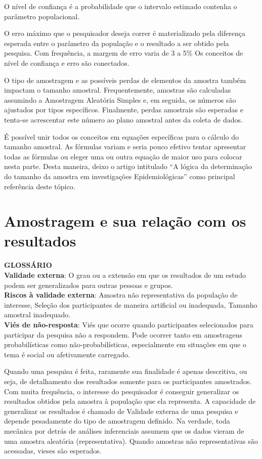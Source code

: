 \documentclass[
]{book}
\begin{document}
O nível de confiança é a probabilidade que o intervalo estimado contenha
o parâmetro populacional.

O erro máximo que o pesquisador deseja correr é materializado pela
diferença esperada entre o parâmetro da população e o resultado a ser
obtido pela pesquisa. Com frequência, a margem de erro varia de 3 a 5\%
Os conceitos de nível de confiança e erro são conectados.

O tipo de amostragem e as possíveis perdas de elementos da amostra
também impactam o tamanho amostral. Frequentemente, amostras são
calculadas assumindo a Amostragem Aleatória Simples e, em seguida, os
números são ajustados por tipos específicos. Finalmente, perdas
amostrais são esperadas e tenta-se acrescentar este número ao plano
amostral antes da coleta de dados.

É possível unir todos os conceitos em equações específicas para o
cálculo do tamanho amostral. As fórmulas variam e seria pouco efetivo
tentar apresentar todas as fórmulas ou eleger uma ou outra equação de
maior uso para colocar nesta parte. Desta maneira, deixo o artigo
intitulado ``A lógica da determinação do tamanho da amostra em
investigações Epidemiológicas'' como principal referência deste tópico.

\hypertarget{amostragem-e-sua-relauxe7uxe3o-com-os-resultados}{%
\section{Amostragem e sua relação com os
resultados}\label{amostragem-e-sua-relauxe7uxe3o-com-os-resultados}}

\begin{glossario}
\textbf{GLOSSÁRIO}\\
\textbf{Validade externa}: O grau ou a extensão em que os resultados de
um estudo podem ser generalizados para outras pessoas e grupos.\\
\textbf{Riscos à validade externa}: Amostra não representativa da
população de interesse, Seleção dos participantes de maneira artificial
ou inadequada, Tamanho amostral inadequado.\\
\textbf{Viés de não-resposta}: Viés que ocorre quando participantes
selecionados para participar da pesquisa não a respondem. Pode ocorrer
tanto em amostragens probabilísticas como não-probabilísticas,
especialmente em situações em que o tema é social ou afetivamente
carregado.
\end{glossario}

Quando uma pesquisa é feita, raramente sua finalidade é apenas
descritiva, ou seja, de detalhamento dos resultados somente para os
participantes amostrados. Com muita frequência, o interesse do
pesquisador é conseguir generalizar os resultados obtidos pela amostra à
população que ela representa. A capacidade de generalizar os resultados
é chamado de Validade externa de uma pesquisa e depende pesadamente do
tipo de amostragem definido. Na verdade, toda mecânica por detrás de
análises inferenciais assumem que os dados vieram de uma amostra
aleatória (representativa). Quando amostras não representativas são
acessadas, vieses são esperados.
\end{document}
